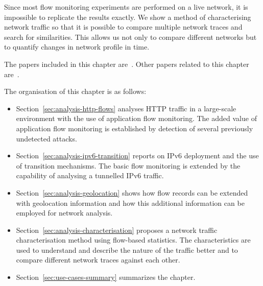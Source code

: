 \begin{chapintro}
Since most flow monitoring experiments are performed on a live network, it is impossible to replicate the results exactly. We show a method of characterising network traffic so that it is possible to compare multiple network traces and search for similarities. This allows us not only to compare different networks but to quantify changes in network profile in time.

The papers included in this chapter are~\cite{Husak-2015-Security, Elich-2013-Investigation, Celeda-2013-Large, Velan-2016-Network}. Other papers related to this chapter are~\cite{Hendriks-2017-Flow, Hendriks-2017-Threats}.

The organisation of this chapter is as follows:
\begin{itemize}
  \item Section~\ref{sec:analysis-http-flows} analyses HTTP traffic in a large-scale environment with the use of application flow monitoring. The added value of application flow monitoring is established by detection of several previously undetected attacks.
  \item Section~\ref{sec:analysis-ipv6-transition} reports on IPv6 deployment and the use of transition mechanisms. The basic flow monitoring is extended by the capability of analysing a tunnelled IPv6 traffic.
  \item Section~\ref{sec:analysis-geolocation} shows how flow records can be extended with geolocation information and how this additional information can be employed for network analysis.
  \item Section~\ref{sec:analysis-characterisation} proposes a network traffic characterisation method using flow-based statistics. The characteristics are used to understand and describe the nature of the traffic better and to compare different network traces against each other.
  \item Section~\ref{sec:use-cases-summary} summarizes the chapter.
\end{itemize}

\end{chapintro}

